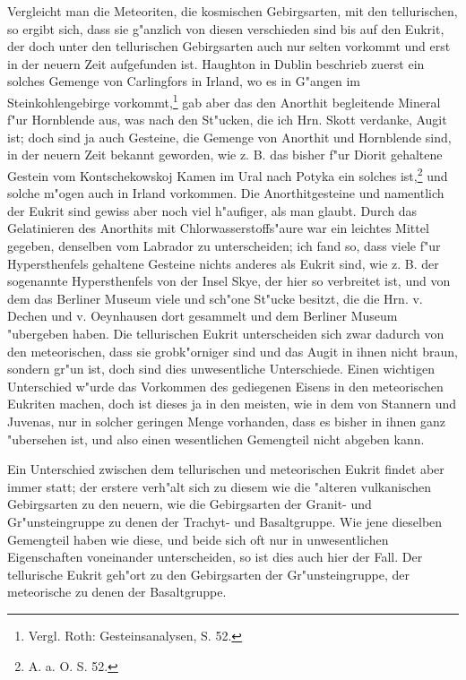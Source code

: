 \documentclass[a4paper, 11pt, oneside, german]{article}
\begin{document}
Vergleicht man die Meteoriten, die kosmischen Gebirgsarten, mit den tellurischen, so ergibt sich, dass sie g"anzlich von diesen verschieden sind bis auf den Eukrit, der doch unter den tellurischen Gebirgsarten auch nur selten vorkommt und erst in der neuern Zeit aufgefunden ist. Haughton in Dublin beschrieb zuerst ein solches Gemenge von Carlingfors in Irland, wo es in G"angen im Steinkohlengebirge vorkommt,\footnote{Vergl. Roth: Gesteinsanalysen, S. 52.} gab aber das den Anorthit begleitende Mineral f"ur Hornblende aus, was nach den St"ucken, die ich Hrn. Skott verdanke, Augit ist; doch sind ja auch Gesteine, die Gemenge von Anorthit und Hornblende sind, in der neuern Zeit bekannt geworden, wie z. B. das bisher f"ur Diorit gehaltene Gestein vom Kontschekowskoj Kamen im Ural nach Potyka ein solches ist,\footnote{A. a. O. S. 52.} und solche m"ogen auch in Irland vorkommen. Die Anorthitgesteine und namentlich der Eukrit sind gewiss aber noch viel h"aufiger, als man glaubt. Durch das Gelatinieren des Anorthits mit Chlorwasserstoffs"aure war ein leichtes Mittel gegeben, denselben vom Labrador zu unterscheiden; ich fand so, dass viele f"ur Hypersthenfels gehaltene Gesteine nichts anderes als Eukrit sind, wie z. B. der sogenannte Hypersthenfels von der Insel Skye, der hier so verbreitet ist, und von dem das Berliner Museum viele und sch"one St"ucke besitzt, die die Hrn. v. Dechen und v. Oeynhausen dort gesammelt und dem Berliner Museum "ubergeben haben. Die tellurischen Eukrit unterscheiden sich zwar dadurch von den meteorischen, dass sie grobk"orniger sind und das Augit in ihnen nicht braun, sondern gr"un ist, doch sind dies unwesentliche Unterschiede. Einen wichtigen Unterschied w"urde das Vorkommen des gediegenen Eisens in den meteorischen Eukriten machen, doch ist dieses ja in den meisten, wie in dem von Stannern und Juvenas, nur in solcher geringen Menge vorhanden, dass es bisher in ihnen ganz "ubersehen ist, und also einen wesentlichen Gemengteil nicht abgeben kann.

Ein Unterschied zwischen dem tellurischen und meteorischen Eukrit findet aber immer statt; der erstere verh"alt sich zu diesem wie die "alteren vulkanischen Gebirgsarten zu den neuern, wie die Gebirgsarten der Granit- und Gr"unsteingruppe zu denen der Trachyt- und Basaltgruppe. Wie jene dieselben Gemengteil haben wie diese, und beide sich oft nur in unwesentlichen Eigenschaften voneinander unterscheiden, so ist dies auch hier der Fall. Der tellurische Eukrit geh"ort zu den Gebirgsarten der Gr"unsteingruppe, der meteorische zu denen der Basaltgruppe.
\end{document}
